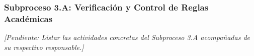 \subsubsection{Subproceso 3.A: Verificación y Control de Reglas Académicas}

\textit{[Pendiente: Listar las actividades concretas del Subproceso 3.A acompañadas de su respectivo responsable.]}

